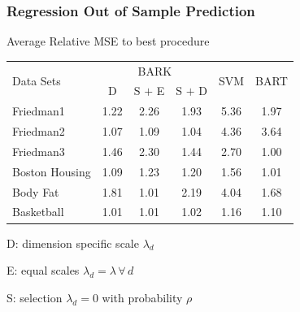 \documentclass[]{beamer}
\newcommand{\bs}[2]{\begin{frame} \frametitle{#1}
{#2}
\end{frame} }
\begin{document}
\bs{Regression Out of Sample Prediction} {
Average Relative MSE to best procedure
\small{
  \begin{tabular}[ht]{|l|c|c|c|c|c|}
    \hline
  \multirow{2}{*}{Data Sets} &
  \multicolumn{3}{c|}{BARK} &
  \multirow{2}{*}{SVM}&
  \multirow{2}{*}{BART} \\
  \cline{2-4}
  &  D
  & S $+$ E & S $+$ D && \\
    \hline
  Friedman1       %
  & 1.22 & 2.26 & 1.93 & 5.36 & 1.97 \\
  Friedman2       %
  & 1.07 & 1.09 & 1.04 & 4.36 & 3.64 \\
  Friedman3       %
  & 1.46 & 2.30 & 1.44 & 2.70 & 1.00 \\
  Boston Housing  %
  & 1.09 & 1.23 & 1.20 & 1.56 & 1.01 \\
  Body Fat        %
  & 1.81 & 1.01 & 2.19 & 4.04 & 1.68 \\
  Basketball      %
  & 1.01 & 1.01 & 1.02 & 1.16 & 1.10 \\\hline
  \end{tabular}
}

D: dimension specific scale $\lambda_d$

E: equal scales $\lambda_d = \lambda \, \forall \, d$

S: selection $\lambda_d = 0$ with probability $\rho$

}

\end{document}
